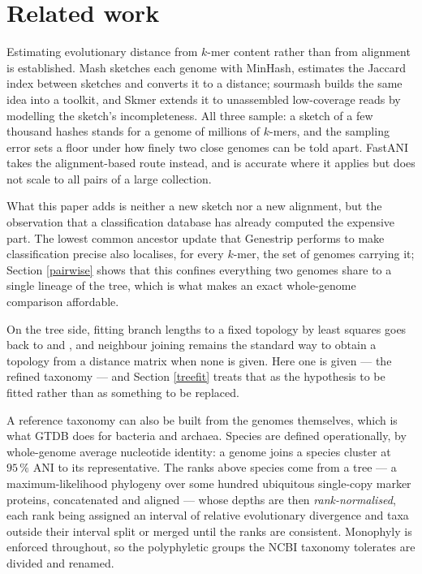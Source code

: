\documentclass[pdflatex,sn-vancouver-num]{sn-jnl}
\begin{document}
\section{Related work}\label{relatedwork}

Estimating evolutionary distance from $k$-mer content rather than from alignment is established.
Mash \cite{Ondov:2016aa} sketches each genome with MinHash, estimates the Jaccard index between
sketches and converts it to a distance; sourmash \cite{pierce2019sourmash} builds the same idea into
a toolkit, and Skmer \cite{skmer} extends it to unassembled low-coverage reads by modelling the
sketch's incompleteness. All three sample: a sketch of a few thousand hashes stands for a genome of
millions of $k$-mers, and the sampling error sets a floor under how finely two close genomes can be
told apart. FastANI \cite{jain2018fastani} takes the alignment-based route instead, and is accurate
where it applies but does not scale to all pairs of a large collection.

What this paper adds is neither a new sketch nor a new alignment, but the observation that a
classification database has already computed the expensive part. The lowest common ancestor update
that Genestrip performs to make classification precise also localises, for every $k$-mer, the set of
genomes carrying it; Section \ref{pairwise} shows that this confines everything two genomes share to
a single lineage of the tree, which is what makes an exact whole-genome comparison affordable.

On the tree side, fitting branch lengths to a fixed topology by least squares goes back to
\cite{cavalli1967phylogenetic} and \cite{fitch1967construction}, and neighbour joining
\cite{saitou1987nj} remains the standard way to obtain a topology from a distance matrix when none is
given. Here one is given --- the refined taxonomy --- and Section \ref{treefit} treats that as the
hypothesis to be fitted rather than as something to be replaced.

A reference taxonomy can also be built from the genomes themselves, which is what GTDB
\cite{parks2022gtdb} does for bacteria and archaea. Species are defined operationally, by whole-genome
average nucleotide identity: a genome joins a species cluster at $95\,\%$ ANI to its representative.
The ranks above species come from a tree --- a maximum-likelihood phylogeny over some hundred
ubiquitous single-copy marker proteins, concatenated and aligned --- whose depths are then
\emph{rank-normalised}, each rank being assigned an interval of relative evolutionary divergence and
taxa outside their interval split or merged until the ranks are consistent. Monophyly is enforced
throughout, so the polyphyletic groups the NCBI taxonomy tolerates are divided and renamed.
\end{document}
